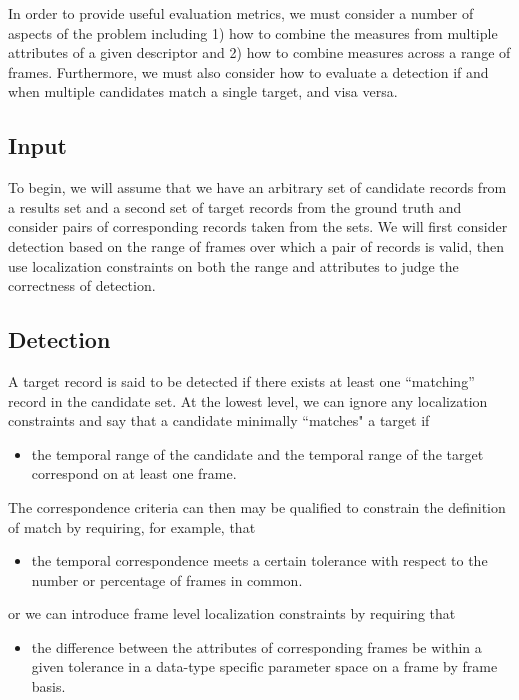 In order to provide useful evaluation metrics, we must consider a
number of aspects of the problem including 1) how to combine the
measures from multiple attributes of a given descriptor and 2) how to
combine measures across a range of frames.  Furthermore, we must also
consider how to evaluate a detection if and when multiple candidates
match a single target, and visa versa.

\subsection{Input}
To begin, we will assume that we have an arbitrary set of candidate
records from a results set and a second set of target records from the
ground truth and consider pairs of corresponding records taken from
the sets. We will first consider detection based on the range of
frames over which a pair of records is valid, then use localization
constraints on both the range and attributes to judge the correctness
of detection.


\subsection{Detection}
\label{s:eval-detect} 
A target record is said to be detected if there exists at least one
``matching'' record in the candidate set.  At the lowest level, we can
ignore any localization constraints and say that a candidate minimally
``matches" a target if
\begin{itemize}
\item the temporal range of the candidate and  the temporal range
of the target correspond on at least one frame.  
\end{itemize}

\noindent The correspondence criteria can then may be qualified to constrain
the definition of match by requiring, for example, that

\begin{itemize}

\item the temporal correspondence meets a certain tolerance with respect to
the number or percentage of frames in common.

\end{itemize}

\noindent or we can introduce frame level localization constraints by requiring
that 
\begin{itemize}
\item the difference between the attributes of corresponding frames be within a given tolerance in a data-type specific parameter space on a frame by frame
basis.  
\end{itemize}

